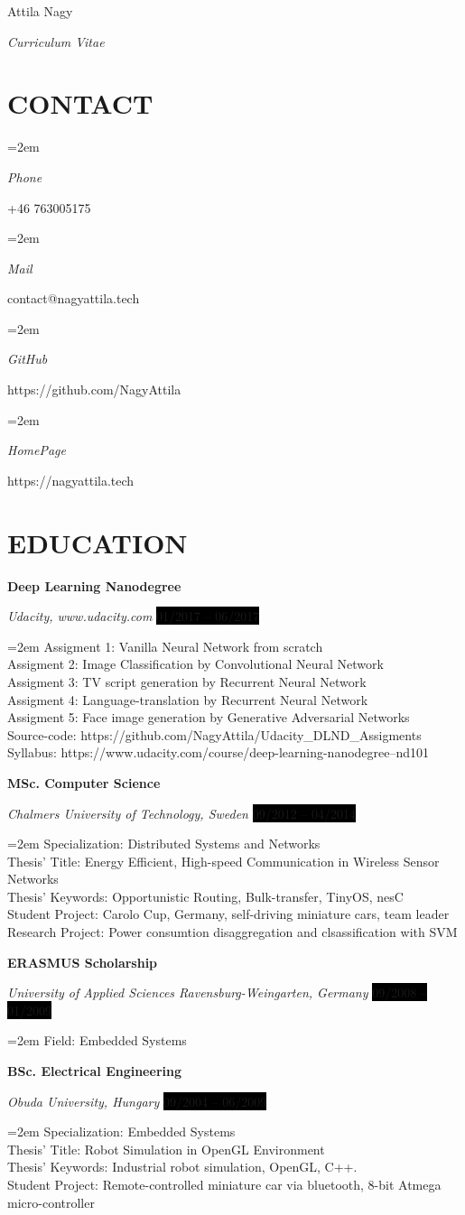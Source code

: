 \documentclass[paper=a4,fontsize=11pt]{scrartcl}	 			%
\newlength{\spacebox}
\newcommand{\sepspace}{\vspace*{1em}}			%
\newcommand{\MyName}[1]{
		\Huge \usefont{OT1}{phv}{b}{n} \hfill #1 		%
		\par \normalsize \normalfont}
\newcommand{\MySlogan}[1]{
		\large \usefont{OT1}{phv}{m}{n}\hfill \textit{#1} %
		\par \normalsize \normalfont}
\newcommand{\NewPart}[1]{\section*{\uppercase{#1}}}
\newcommand{\PersonalEntry}[2]{
		\noindent\hangindent=2em\hangafter=0 		%
		\parbox{\spacebox}{						%
		\textit{#1}}								%
		\hspace{1.5em} #2 \par}					%
\newcommand{\EducationEntry}[4]{
		\noindent \textbf{#1} \par 					%
		\noindent \textit{#3} \hfill					%
		\colorbox{Black}{%
			\hfill\color{White}#2} \par				%
		\noindent\hangindent=2em\hangafter=0 \small #4 	%
		\normalsize \par
    }
\begin{document}
\MyName{Attila Nagy}
\MySlogan{Curriculum Vitae}

\NewPart{Contact}{}

\PersonalEntry{Phone}{+46 763005175}
\PersonalEntry{Mail}{contact@nagyattila.tech}
\PersonalEntry{GitHub}{https://github.com/NagyAttila}
\PersonalEntry{HomePage}{https://nagyattila.tech}

\NewPart{Education}{}

\EducationEntry{Deep Learning Nanodegree}{01/2017 -- 06/2017}
{Udacity, www.udacity.com} {Assigment 1: Vanilla Neural Network from scratch\\
 Assigment 2: Image Classification by Convolutional Neural Network\\
 Assigment 3: TV script generation by Recurrent Neural Network\\
 Assigment 4: Language-translation by Recurrent Neural Network\\
 Assigment 5: Face image generation by Generative Adversarial Networks \\
 Source-code: https://github.com/NagyAttila/Udacity\_DLND\_Assigments \\
 Syllabus: https://www.udacity.com/course/deep-learning-nanodegree--nd101 }
\sepspace


\EducationEntry{MSc. Computer Science}{09/2012 -- 04/2014}
  {Chalmers University of Technology, Sweden}{Specialization: Distributed Systems and Networks\\
  Thesis' Title: Energy Efficient, High-speed Communication in Wireless Sensor Networks\\
  Thesis' Keywords: Opportunistic Routing, Bulk-transfer, TinyOS, nesC\\
  Student Project: Carolo Cup, Germany, self-driving miniature cars, team leader\\
  Research Project: Power consumtion disaggregation and clsassification with SVM}
\sepspace

\EducationEntry{ERASMUS Scholarship}{09/2008 -- 01/2009}
{University of Applied Sciences Ravensburg-Weingarten, Germany}
{Field: Embedded Systems }
\sepspace

\EducationEntry{BSc. Electrical Engineering}{09/2004 -- 06/2009}{Obuda University, Hungary}{Specialization: Embedded Systems\\
Thesis' Title: Robot Simulation in OpenGL Environment\\
Thesis' Keywords: Industrial robot simulation, OpenGL, C++. \\
Student Project: Remote-controlled miniature car via bluetooth, 8-bit Atmega micro-controller}
\end{document}
